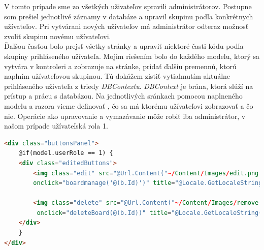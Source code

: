 \documentclass[11pt, oneside]{report}
\begin{document}
V tomto prípade sme zo všetkých uživateľov spravili administrátorov. Postupne som prešiel jednotlivé záznamy v databáze a upravil skupinu podľa konkrétnych užívateľov. Pri vytvárani nových užívateľov má administrátor odteraz možnosť zvoliť skupinu novému užívateľovi.\\ Ďalšou časťou bolo prejsť všetky stránky a upraviť  niektoré časti kódu podľa skupiny prihláseného užívateľa. Mojim riešením bolo do každého modelu, ktorý sa vytvára v kontroleri a zobrazuje na stránke, pridať ďalšiu premennú, ktorú naplním užívateľovou skupinou. Tú dokážem zistiť vytiahnutím aktuálne prihláseného uživateľa z triedy \textit{DBContextu}. \textit{DBContext} je brána, ktorá slúží na prístup a prácu s databázou. Na jednotlivých sránkach pomocou naplneného modelu  a razora vieme definovať , čo sa má ktorému užívateľovi zobrazovať a čo nie. Operácie ako upravovanie a vymazávanie môže robiť iba administrátor, v našom prípade užívateľská rola 1. 
\begin{lstlisting}[language=html,caption=Zobrazenie operácii pre administrátora,captionpos=b]
<div class="buttonsPanel">
    @if(model.userRole == 1) {
    <div class="editedButtons">
        <img class="edit" src="@Url.Content("~/Content/Images/edit.png ")"
        onclick="boardmanage('@(b.Id)')" title="@Locale.GetLocaleString("edit")" />
        
        <img class="delete" src="@Url.Content("~/Content/Images/remove.png")"
         onclick="deleteBoard(@(b.Id))" title="@Locale.GetLocaleString("delete")"/>
    </div>
    }
</div>
\end{lstlisting}
\end{document}
